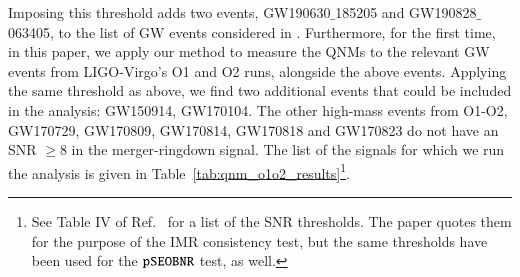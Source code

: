 Imposing this threshold adds two events, GW190630$\_$185205 and GW190828$\_$063405, to the list of GW events considered in \cite{Abbott:2020jks}. Furthermore, for the first time, in this paper, we apply our method to
measure the QNMs to the relevant GW events from LIGO-Virgo's O1 and O2 runs, alongside
the above events. Applying the same threshold as above, we find two
additional events that could be included in the analysis: GW150914,
GW170104. The other high-mass events from O1-O2, GW170729, GW170809,
GW170814, GW170818 and GW170823 do not have an SNR $\geq 8$ in the
merger-ringdown signal. The list of the signals for which we run the analysis is given in Table~\ref{tab:qnm_o1o2_results}\footnote{See Table IV of Ref.~\cite{Abbott:2020jks} for a list of the SNR
  thresholds. The paper quotes them for the purpose of the IMR
  consistency test, but the same thresholds have been used for the
  $\texttt{pSEOBNR}$ test, as well.}.
  
